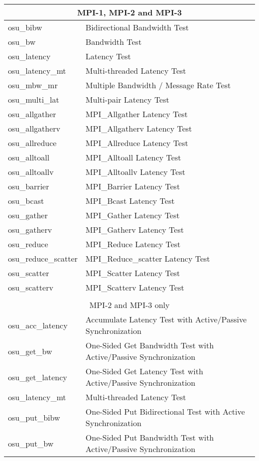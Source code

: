 \begin{center}
\begin{tabular}{ll}
\multicolumn{2}{c}{MPI-1, MPI-2 and MPI-3}\\
\hline
osu\_bibw & Bidirectional Bandwidth Test\\
osu\_bw & Bandwidth Test\\
osu\_latency & Latency Test\\
osu\_latency\_mt & Multi-threaded Latency Test \\
osu\_mbw\_mr & Multiple Bandwidth / Message Rate Test\\
osu\_multi\_lat & Multi-pair Latency Test\\
osu\_allgather & MPI\_Allgather Latency Test \\
osu\_allgatherv & MPI\_Allgatherv Latency Test\\
osu\_allreduce & MPI\_Allreduce Latency Test\\
osu\_alltoall & MPI\_Alltoall Latency Test\\
osu\_alltoallv & MPI\_Alltoallv Latency Test\\
osu\_barrier & MPI\_Barrier Latency Test\\
osu\_bcast & MPI\_Bcast Latency Test\\
osu\_gather & MPI\_Gather Latency Test \\ 
osu\_gatherv & MPI\_Gatherv Latency Test\\
osu\_reduce & MPI\_Reduce Latency Test\\
osu\_reduce\_scatter & MPI\_Reduce\_scatter Latency Test\\
osu\_scatter & MPI\_Scatter Latency Test\\
osu\_scatterv & MPI\_Scatterv Latency Test\\
&\\
\multicolumn{2}{c}{MPI-2 and MPI-3 only}\\
\hline
osu\_acc\_latency & Accumulate Latency Test with Active/Passive Synchronization\\
osu\_get\_bw & One-Sided Get Bandwidth Test with Active/Passive Synchronization\\
osu\_get\_latency & One-Sided Get Latency Test with Active/Passive Synchronization\\
osu\_latency\_mt & Multi-threaded Latency Test\\
osu\_put\_bibw & One-Sided Put Bidirectional Test with Active Synchronization\\
osu\_put\_bw & One-Sided Put Bandwidth Test with Active/Passive Synchronization\\

\end{tabular}
\end{center}
